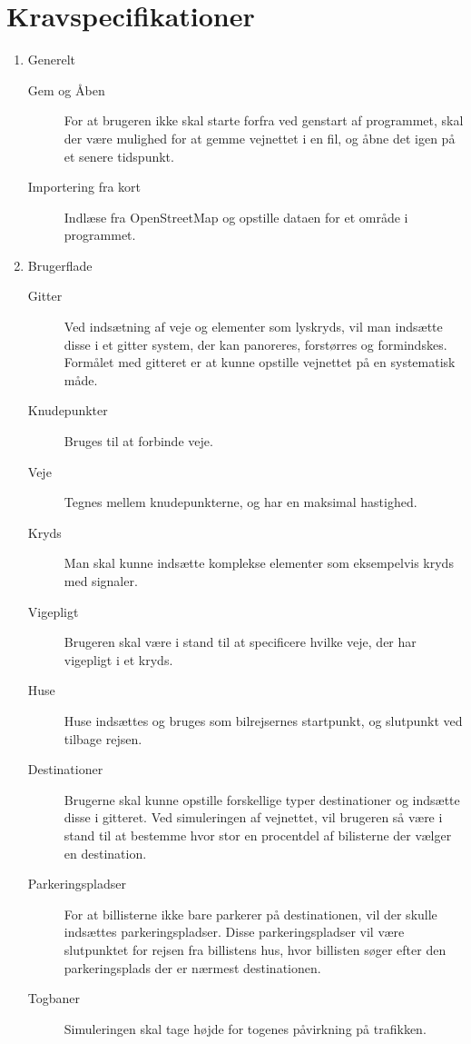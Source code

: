 \chapter{Kravspecifikationer}\label{Kravspecifikationer}

\begin{enumerate}
\item Generelt
	\begin{description}
	\item [Gem og Åben] For at brugeren ikke skal starte forfra ved genstart af programmet, skal der være mulighed for at gemme vejnettet i en fil, og åbne det igen på et senere tidspunkt.
	\item [Importering fra kort] Indlæse fra OpenStreetMap og opstille dataen for et område i programmet.
	\end{description}
\item Brugerflade
	\begin{description}
	\item [Gitter] Ved indsætning af veje og elementer som lyskryds, vil man indsætte disse i et gitter system, der kan panoreres, forstørres og formindskes. Formålet med gitteret er at kunne opstille vejnettet på en systematisk måde.
	\item [Knudepunkter] Bruges til at forbinde veje.
	\item [Veje] Tegnes mellem knudepunkterne, og har en maksimal hastighed.
	\item [Kryds] Man skal kunne indsætte komplekse elementer som eksempelvis kryds med signaler.
	\item [Vigepligt] Brugeren skal være i stand til at specificere hvilke veje, der har vigepligt i et kryds.
	\item [Huse] Huse indsættes og bruges som bilrejsernes startpunkt, og slutpunkt ved tilbage rejsen.
	\item [Destinationer] Brugerne skal kunne opstille forskellige typer destinationer og indsætte disse i gitteret. Ved simuleringen af vejnettet, vil brugeren så være i stand til at bestemme hvor stor en procentdel af bilisterne der vælger en destination.
	\item [Parkeringspladser] For at billisterne ikke bare parkerer på destinationen, vil der skulle indsættes parkeringspladser. Disse parkeringspladser vil være slutpunktet for rejsen fra billistens hus, hvor billisten søger efter den parkeringsplads der er nærmest destinationen.
	\item [Togbaner] Simuleringen skal tage højde for togenes påvirkning på trafikken.

\end{description}
\end{enumerate}
